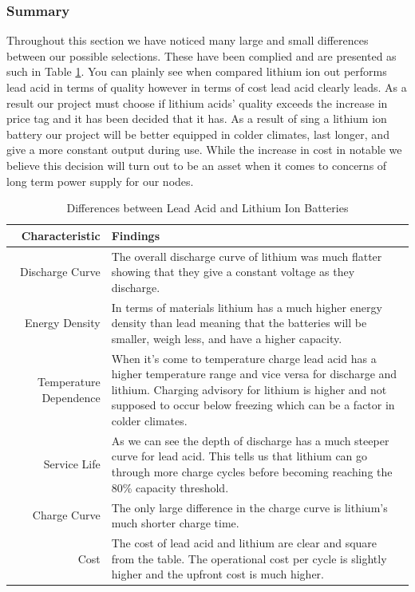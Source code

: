 \subsubsection{Summary}
Throughout this section we have noticed many large and small differences between our possible selections. These have been complied and are presented as such in Table \ref{tab:battery-comparison}. You can plainly see when compared lithium ion out performs lead acid in terms of quality however in terms of cost lead acid clearly leads. As a result our project must choose if lithium acids' quality exceeds the increase in price tag and it has been decided that it has. As a result of sing a lithium ion battery our project will be better equipped in colder climates, last longer, and give a more constant output during use. While the increase in cost in notable we believe this decision will turn out to be an asset when it comes to concerns of long term power supply for our nodes.
\begin{table}
\centering\footnotesize
\caption{Differences between Lead Acid and Lithium Ion Batteries}
\begin{tabularx}{\linewidth}{|r|X|}
\hline
Characteristic & Findings \\\hline

Discharge Curve & The overall discharge curve of lithium was much flatter showing that they give a constant voltage as they discharge. 
  \\\hline
Energy Density & In terms of materials lithium has a much higher energy density than lead meaning that the batteries will be smaller, weigh less, and have a higher capacity. 
  \\\hline
Temperature Dependence & When it's come to temperature charge lead acid has a higher temperature range and vice versa for discharge and lithium. Charging advisory for lithium is higher and not supposed to occur below freezing which can be a factor in colder climates. 
  \\\hline
Service Life&As we can see the depth of discharge has a much steeper curve for lead acid. This tells us that lithium can go through more charge cycles before becoming reaching the 80\% capacity threshold. 
  \\\hline
Charge Curve&The only large difference in the charge curve is lithium's much shorter charge time. \\\hline
Cost&The cost of lead acid and lithium are clear and square from the table. The operational cost per cycle is slightly higher and the upfront cost is much higher.
  \\\hline
\end{tabularx}
\label{tab:battery-comparison}
\end{table}

